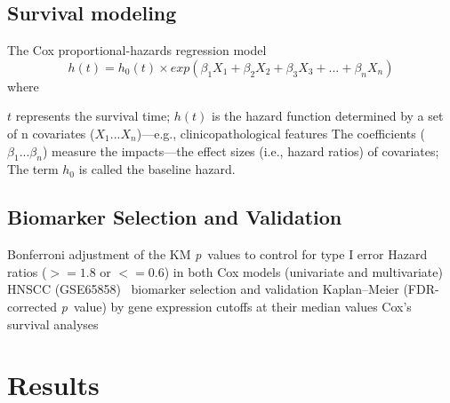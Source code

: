 \documentclass[
paper=landscape,
paper=160mm:90mm, %
fontsize=11pt, %
pagesize, %
parskip=half-, %
]{scrartcl} %
\theoremstyle{mythmstyle} %
\begin{document}
\clearpage

\subsection{Survival modeling}
\large The Cox proportional-hazards regression model~\cite{Cox1972,Andersen1982,Bradburn2003b}\\
$$h(t) = h_0(t) \times exp(\beta_1 X_1 + \beta_2 X_2 + \beta_3 X_3 + ... + \beta_n X_n)$$
\noindent where
\begin{outline} %
\1 $t$ represents the survival time;
\1 $h(t)$ is the hazard function determined by a set of n covariates ($X_1...X_n$)---e.g., clinicopathological features
\1 The coefficients ($\beta_1...\beta_n$) measure the impacts---the effect sizes (i.e., hazard ratios) of covariates;
\1 The term $h_0$ is called the baseline hazard.
\end{outline}


\clearpage

\subsection{Biomarker Selection and Validation}
\begin{outline}


\1 \large Bonferroni adjustment of the KM \textit{p}~values to control for type I error
\1 Hazard ratios ($>=1.8$ or $<=0.6$) in both Cox models (univariate and multivariate)
\1 HNSCC (GSE65858)~\cite{Wichmann2015}
    \2 biomarker selection and validation
    \2 Kaplan--Meier (FDR-corrected \textit{p}~value) by gene expression cutoffs at their median values
    \2 Cox's survival analyses 

\end{outline}
\clearpage



\section{Results}

\clearpage

\thispagestyle{headings}
\end{document}

